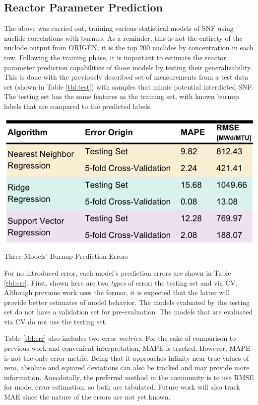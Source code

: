 \subsection{Reactor Parameter Prediction}
\label{sec:rxtrparam}

The above was carried out, training various statistical models of \gls{SNF}
using nuclide correlations with burnup. As a reminder, this is not the entirety
of the nuclode output from \gls{ORIGEN}; it is the top 200 nuclides by
concentration in each row. Following the training phase, it is important to
estimate the reactor parameter prediction capabilities of those models by
testing their generalizability.  This is done with the previously described set
of measurements from a test data set (shown in Table \ref{tbl:test}) with
samples that mimic potential interdicted \gls{SNF}. The testing set has the
same features as the training set, with known burnup labels that are compared
to the predicted labels. 

\begin{table}[!htb]
  \centering
  \includegraphics[width=0.8\linewidth]{./chapters/method/results1.png}
  \caption{Three Models' Burnup Prediction Errors}
  \label{tbl:err}
\end{table}

For no introduced error, each model's prediction errors are shown in Table
\ref{tbl:err}.  First, shown here are two \textit{types} of error: the testing
set and via \gls{CV}.  Although previous work uses the former, it is expected
that the latter will provide better estimates of model behavior.  The models
evaluated by the testing set do not have a validation set for pre-evaluation.
The models that are evaluated via \gls{CV} do not use the testing set. 

Table \ref{tbl:err} also includes two error \textit{metrics}.  For the sake of
comparison to previous work and convenient interpretation, \gls{MAPE} is
tracked. However, \gls{MAPE} is not the only error metric. Being that it
approaches infinity near true values of zero, absolute and squared deviations
can also be tracked and may provide more information.  Anecdotally, the
preferred method in the community is to use \gls{RMSE} for model error
estimation, so both are tabulated.  Future work will also track \gls{MAE} since
the nature of the errors are not yet known.  

